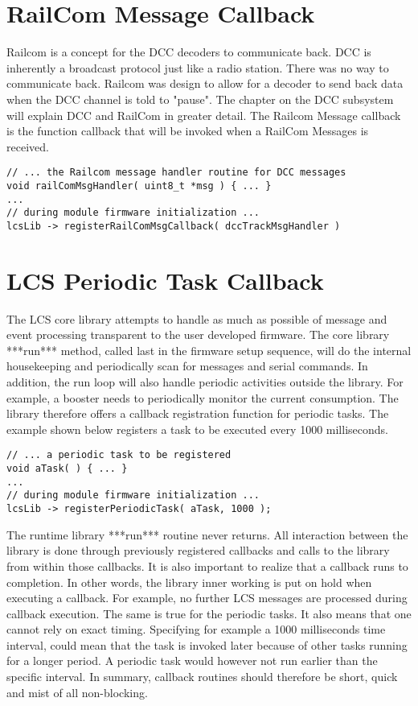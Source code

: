 \section{RailCom Message Callback}

Railcom is a concept for the DCC decoders to communicate back. DCC is inherently a broadcast protocol just like a radio station. There was no way to communicate back.  Railcom was design to allow for a decoder to send back data when the DCC channel is told to "pause". The chapter on the DCC subsystem will explain DCC and RailCom in greater detail. The Railcom Message callback is the function callback that will be invoked when a RailCom Messages is received.

\lstset{style=codesnippetstyle}
\begin{lstlisting}
// ... the Railcom message handler routine for DCC messages
void railComMsgHandler( uint8_t *msg ) { ... }
...
// during module firmware initialization ...
lcsLib -> registerRailComMsgCallback( dccTrackMsgHandler )
\end{lstlisting}

\section{LCS Periodic Task Callback}

The LCS core library attempts to handle as much as possible of message and event processing transparent to the user developed firmware. The core library ***run*** method, called last in the firmware setup sequence, will do the internal housekeeping and periodically scan for messages and serial commands. In addition, the run loop will also handle periodic activities outside the library. For example, a booster needs to periodically monitor the current consumption. The library therefore offers a callback registration function for periodic tasks. The example shown below registers a task to be executed every 1000 milliseconds.

\lstset{style=codesnippetstyle}
\begin{lstlisting}
// ... a periodic task to be registered
void aTask( ) { ... }
...
// during module firmware initialization ...
lcsLib -> registerPeriodicTask( aTask, 1000 );
\end{lstlisting}

The runtime library ***run*** routine never returns. All interaction between the library is done through previously registered callbacks and calls to the library from within those callbacks. It is also important to realize that a callback runs to completion. In other words, the library inner working is put on hold when executing a callback. For example, no further LCS messages are processed during callback execution. The same is true for the periodic tasks. It also means that one cannot rely on exact timing. Specifying for example a 1000 milliseconds time interval, could mean that the task is invoked later because of other tasks running for a longer period. A periodic task would however not run earlier than the specific interval. In summary, callback routines should therefore be short, quick and mist of all non-blocking.

